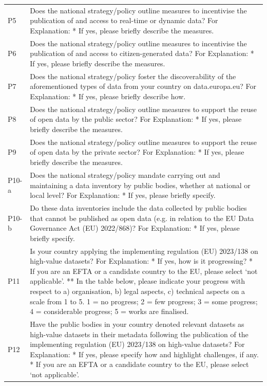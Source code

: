 {\begin{longtable}[]{@{}
  L{0.1386}
  L{0.8614}@{}}
P5 & Does the national strategy/policy outline measures to incentivise the publication of and access to real-time or dynamic data? For Explanation: * If yes, please briefly describe the measures. \\
P6 & Does the national strategy/policy outline measures to incentivise the publication of and access to citizen-generated data? For Explanation: * If yes, please briefly describe the measures. \\
P7 & Does the national strategy/policy foster the discoverability of the aforementioned types of data from your country on data.europa.eu? For Explanation: * If yes, please briefly describe how. \\
P8 & Does the national strategy/policy outline measures to support the reuse of open data by the public sector? For Explanation: * If yes, please briefly describe the measures. \\
P9 & Does the national strategy/policy outline measures to support the reuse of open data by the private sector? For Explanation: * If yes, please briefly describe the measures. \\
P10-a & Does the national strategy/policy mandate carrying out and maintaining a data inventory by public bodies, whether at national or local level? For Explanation: * If yes, please briefly specify. \\
P10-b & Do these data inventories include the data collected by public bodies that cannot be published as open data (e.g. in relation to the EU Data Governance Act (EU) 2022/868)? For Explanation: * If yes, please briefly specify. \\
P11 & Is your country applying the implementing regulation (EU) 2023/138 on high-value datasets? For Explanation: * If yes, how is it progressing? * If you are an EFTA or a candidate country to the EU, please select `not applicable'. ** In the table below, please indicate your progress with respect to a) organisation, b) legal aspects, c) technical aspects on a scale from 1 to 5. 1 = no progress; 2 = few progress; 3 = some progress; 4 = considerable progress; 5 = works are finalised. \\
P12 & Have the public bodies in your country denoted relevant datasets as high-value datasets in their metadata following the publication of the implementing regulation (EU) 2023/138 on high-value datasets? For Explanation: * If yes, please specify how and highlight challenges, if any. * If you are an EFTA or a candidate country to the EU, please select `not applicable'. \\

\end{longtable}}
